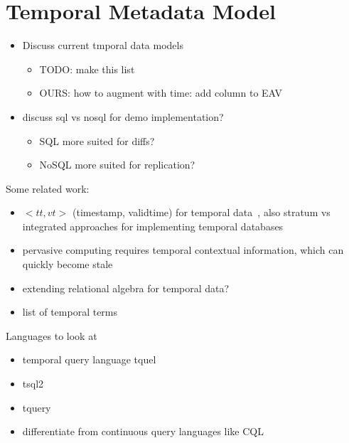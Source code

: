 \section{Temporal Metadata Model}

\begin{itemize}
\item Discuss current tmporal data models
    \begin{itemize}
    \item TODO: make this list
    \item OURS: how to augment with time: add column to EAV
    \end{itemize}
\item discuss sql vs nosql for demo implementation?
    \begin{itemize}
    \item SQL more suited for diffs?
    \item NoSQL more suited for replication?
    \end{itemize}
\end{itemize}

Some related work:
\begin{itemize}
\item $<tt, vt>$ (timestamp, validtime) for temporal data~\cite{jensen1999temporal},
also stratum vs integrated approaches for implementing temporal databases
\item pervasive computing requires temporal contextual information, which
can quickly become stale~\cite{henricksen2002modeling}
\item extending relational algebra for temporal data?~\cite{lorentzos1988extending}
\item list of temporal terms~\cite{dyreson1994consensus}
\end{itemize}
Languages to look at
\begin{itemize}
\item temporal query language tquel~\cite{snodgrass1987temporal}
\item tsql2~\cite{snodgrass2012tsql2}
\item tquery~\cite{kahn1991tquery}
\item differentiate from continuous query languages like CQL~\cite{arasu2006cql}
\end{itemize}


